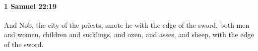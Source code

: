 
		\paragraph{1 Samuel 22:19} %
			\label{1SAMUEL-22-19}

			And Nob, the city of the priests, smote he with the edge of the sword, both men and women, children and sucklings, and oxen, and asses, and sheep, with the edge of the sword.


